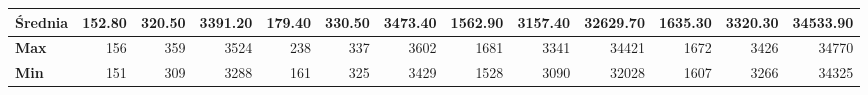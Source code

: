 \begin{table}[bh]
{{\begin{tabular}{|l|r|r|r|r|r|r|r|r|r|r|r|r|}
		\textbf{Średnia}                                              & \textbf{152.80}                  & \textbf{320.50}                   & \textbf{3391.20}                   & \textbf{179.40}                  & \textbf{330.50}                   & \textbf{3473.40}                   & \textbf{1562.90}                 & \textbf{3157.40}                  & \textbf{32629.70}                  & \textbf{1635.30}                 & \textbf{3320.30}                  & \textbf{34533.90}                  \\ \hline
		\textbf{Max}                                           & 156                           & 359                            & 3524                            & 238                           & 337                            & 3602                            & 1681                          & 3341                           & 34421                           & 1672                          & 3426                           & 34770                           \\ \hline
		\textbf{Min}                                              & 151                           & 309                            & 3288                            & 161                           & 325                            & 3429                            & 1528                          & 3090                           & 32028                           & 1607                          & 3266                           & 34325                           \\ \hline
	\end{tabular}
}}
\end{table}


